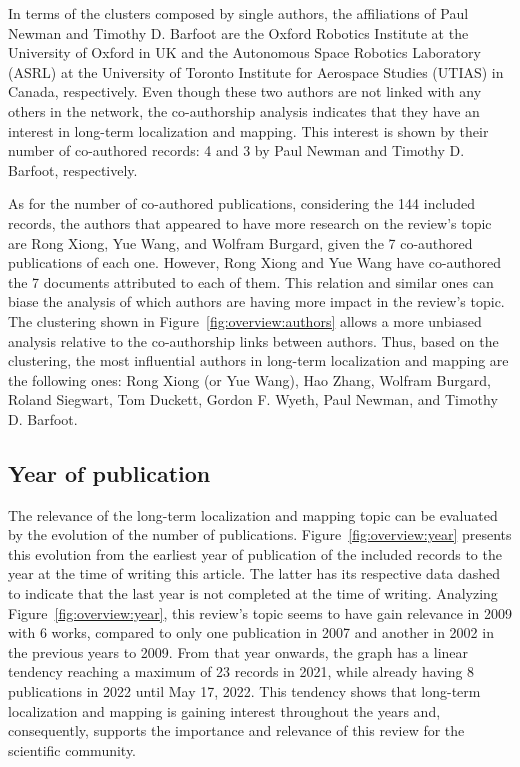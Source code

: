 In terms of the clusters composed by single authors, the affiliations of Paul Newman and Timothy D. Barfoot are the Oxford Robotics Institute at the University of Oxford in UK and the Autonomous Space Robotics Laboratory (ASRL) at the University of Toronto Institute for Aerospace Studies (UTIAS) in Canada, respectively. Even though these two authors are not linked with any others in the network, the co-authorship analysis indicates that they have an interest in long-term localization and mapping. This interest is shown by their number of co-authored records: 4 and 3 by Paul Newman and Timothy D. Barfoot, respectively.

As for the number of co-authored publications, considering the 144 included records, the authors that appeared to have more research on the review's topic are Rong Xiong, Yue Wang, and Wolfram Burgard, given the 7 co-authored publications of each one. However, Rong Xiong and Yue Wang have co-authored the 7 documents attributed to each of them. This relation and similar ones can biase the analysis of which authors are having more impact in the review's topic.
The clustering shown in Figure~\ref{fig:overview:authors} allows a more unbiased analysis relative to the co-authorship links between authors. Thus, based on the clustering, the most influential authors in long-term localization and mapping are the following ones: Rong Xiong (or Yue Wang), Hao Zhang, Wolfram Burgard, Roland Siegwart, Tom Duckett, Gordon F. Wyeth, Paul Newman, and Timothy D. Barfoot.

\subsection{Year of publication}
\label{sec:overview:year}

The relevance of the long-term localization and mapping topic can be evaluated by the evolution of the number of publications. Figure~\ref{fig:overview:year} presents this evolution from the earliest year of publication of the included records to the year at the time of writing this article. The latter has its respective data dashed to indicate that the last year is not completed at the time of writing. Analyzing Figure~\ref{fig:overview:year}, this review's topic seems to have gain relevance in 2009 with 6 works, compared to only one publication in 2007 and another in 2002 in the previous years to 2009. From that year onwards, the graph has a linear tendency reaching a maximum of 23 records in 2021, while already having 8 publications in 2022 until May 17, 2022. This tendency shows that long-term localization and mapping is gaining interest throughout the years and, consequently, supports the importance and relevance of this review for the scientific community.

